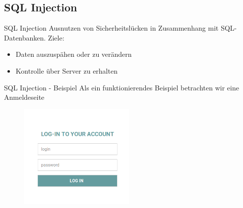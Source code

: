 \documentclass[10pt]{beamer}
\begin{document}

\subsection{SQL Injection}

\begin{frame}[fragile]{SQL Injection}
  Ausnutzen von Sicherheitsl\"ucken in Zusammenhang mit SQL-Datenbanken.
  Ziele:
  \begin{itemize}
    \item Daten auszusp\"ahen oder zu ver\"andern
    \item Kontrolle \"uber Server zu erhalten
  \end{itemize}
\end{frame}


\begin{frame}[fragile]{SQL Injection - Beispiel}
  Als ein funktionierendes Beispiel betrachten wir eine Anmeldeseite
  \newline
  \begin{figure}[h]
    \centering
    \includegraphics[width=0.5\textwidth]{sql_ex_1}
  \end{figure}
\end{frame}
\end{document}
